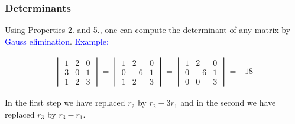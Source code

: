 \documentclass[11pt,aspectratio=169]{beamer}
\begin{document}
\begin{frame}
\frametitle{Determinants}
\begin{small}
Using Properties 2. and 5., one can compute the  determinant of any matrix by  \textcolor{blue}{Gauss elimination}.
\vskip 12pt
\textcolor{blue}{Example:} 

\begin{equation*} \begin{split}
 \begin{vmatrix}
1 & 2 & 0\\
3 & 0 & 1 \\
1 & 2 & 3
\end{vmatrix}=\begin{vmatrix}
1 & 2 & 0\\
0 & -6 & 1 \\
1 & 2 & 3
\end{vmatrix}=\begin{vmatrix}
1 & 2 & 0\\
0 & -6 & 1 \\0 & 0 & 3
\end{vmatrix}=-18
\end{split}
\end{equation*}

\begin{tiny}In the first step we have replaced $r_2$ by $r_2-3r_1$ and in the second we have replaced $r_3$ by $r_3-r_1$.\end{tiny}


\end{small}
\end{frame}
\end{document}

